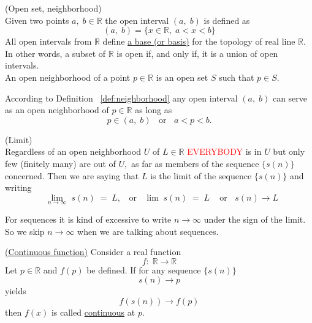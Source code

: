 \documentclass[color=black,11pt]{elegantpaper}
\begin{document}
\begin{definition}
\label{def:neighborhood}
(Open set, neighborhood)\\
Given two points $a,\;b\in \mathbb{R}$ the open interval $(a,\;b)$ is defined as
$$
(a,\;b) =\{x\in \mathbb{R},\;a<x<b\}
$$
All open intervals from $\mathbb{R}$ define \href{https://en.wikipedia.org/wiki/Base_(topology)}{a base (or basis)} for the topology of real line $\mathbb{R}.$ In other words, a subset of $\mathbb{R}$ is open if, and only if, it is a union of open intervals.\\
An open neighborhood of a point $p\in \mathbb{R}$ is an open set $S$ such that $p \in S.$
\end{definition}
According to Definition ~\ref{def:neighborhood} any open interval $(a,\;b)$ can serve as an open neighborhood of $p\in\mathbb{R}$ as long as 
$$
p \in (a,\;b)\;\;\mbox{ or } \;\;a<p<b.
$$
\begin{definition}
\label{def:limit}
(Limit)\\
Regardless of  an open neighborhood $U$ of $L\in \mathbb{R}$ \textcolor{red}{EVERYBODY} is in $U$ but only few (finitely many) are out of $U,$ as far as members of the sequence  $\{s(n)\}$ concerned. Then we are saying that $L$ is the limit of the sequence  $\{s(n)\}$ and writing
$$
\;\;\lim_{n\to \infty} \; s(n) \; =\; L, \;\;\mbox{ or }\;\;\lim \;s(n) \;=\; L\;\;\;\mbox{ or } \;\;s(n) \to L
$$ 
\end{definition}
For sequences it is kind of excessive to write $n\to \infty$ under the sign of the limit. So we skip $n \to \infty $ when we are talking about sequences.
\begin{definition}
\href{https://en.wikipedia.org/wiki/Continuous_function}{(Continuous function)}
Consider a real function 
$$
f:\;\mathbb{R} \to \mathbb{R}
$$
Let $p\in \mathbb{R}$ and $f(p)$ be defined. If for any sequence $\{s(n)\}$ 
$$
s(n) \to p
$$
yields
$$
f(s(n)) \to f(p)
$$
then $f(x)$ is called \href{https://en.wikipedia.org/wiki/Continuous_function}{continuous} at $p.$ 
\end{definition}
\end{document}

